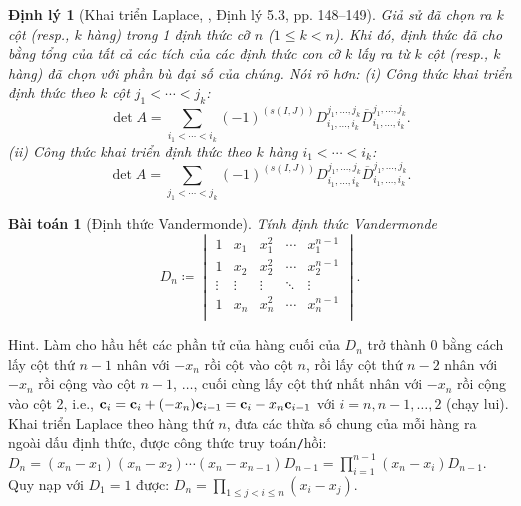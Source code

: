 \documentclass{article}
\newtheorem{baitoan}{Bài toán}
\newtheorem{dinhly}{Định lý}
\begin{document}
\begin{dinhly}[Khai triển Laplace, \cite{Hung_linear_algebra}, Định lý 5.3, pp. 148--149]
	Giả sử đã chọn ra $k$ cột (resp., $k$ hàng) trong 1 định thức cỡ $n$ ($1\le k < n$). Khi đó, định thức đã cho bằng tổng của tất cả các tích của các định thức con cỡ $k$ lấy ra từ $k$ cột (resp., $k$ hàng) đã chọn với phần bù đại số của chúng. Nói rõ hơn: (i) Công thức khai triển định thức theo $k$ cột $j_1 < \cdots < j_k$:
	\begin{equation*}
		\det A = \sum_{i_1 < \cdots < i_k} (-1)^{(s(I,J))}D_{i_1,\ldots,i_k}^{j_1,\ldots,j_k}\overline{D}_{i_1,\ldots,i_k}^{j_1,\ldots,j_k}.
	\end{equation*}
	(ii) Công thức khai triển định thức theo $k$ hàng $i_1 < \cdots < i_k$:
	\begin{equation*}
		\det A = \sum_{j_1 < \cdots < j_k} (-1)^{(s(I,J))}D_{i_1,\ldots,i_k}^{j_1,\ldots,j_k}\overline{D}_{i_1,\ldots,i_k}^{j_1,\ldots,j_k}.
	\end{equation*}
\end{dinhly}

\begin{baitoan}[Định thức Vandermonde]
	Tính định thức Vandermonde
	\begin{equation*}
		D_n\coloneqq\begin{vmatrix}
			1 & x_1 & x_1^2 & \cdots & x_1^{n-1}\\
			1 & x_2 & x_2^2 & \cdots & x_2^{n-1}\\
			\vdots & \vdots & \vdots & \ddots & \vdots\\
			1 & x_n & x_n^2 & \cdots & x_n^{n-1}\\
		\end{vmatrix}.
	\end{equation*}
\end{baitoan}
{\sf Hint.} Làm cho hầu hết các phần tử của hàng cuối của $D_n$ trở thành 0 bằng cách lấy cột thứ $n - 1$ nhân với $-x_n$ rồi cột vào cột $n$, rồi lấy cột thứ $n - 2$ nhân với $-x_n$ rồi cộng vào cột $n - 1$, $\ldots$, cuối cùng lấy cột thứ nhất nhân với $-x_n$ rồi cộng vào cột 2, i.e., ${\bf c}_i = {\bf c}_i + (-x_n){\bf c}_{i-1} = {\bf c}_i - x_n{\bf c}_{i-1}$ với $i = n,n - 1,\ldots,2$ (chạy lui). Khai triển Laplace theo hàng thứ $n$, đưa các thừa số chung của mỗi hàng ra ngoài dấu định thức, được công thức truy toán{\tt/}hồi: $D_n = (x_n - x_1)(x_n - x_2)\cdots(x_n - x_{n-1})D_{n-1} = \prod_{i=1}^{n-1} (x_n - x_i)D_{n-1}$. Quy nạp với $D_1 = 1$ được: $D_n = \prod_{1\le j < i\le n} (x_i - x_j)$.
\end{document}
